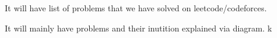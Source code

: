 

It will have list of problems that we have solved on leetcode/codeforces.

It will mainly have problems and their inutition explained via diagram.
k












